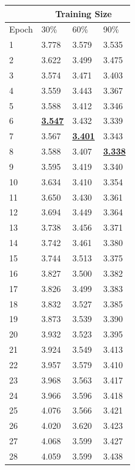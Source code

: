 \documentclass[12pt]{article}
\begin{document}
\begin{center}
          \tiny
          \begin{tabular}{|l || l| l| l|}
            \hline
            &\multicolumn{3}{|c|}{Training Size} \\
            \hline
            Epoch & 30\% & 60\% & 90\% \\
            \hline
            1 & 3.778 & 3.579 & 3.535 \\
            2 & 3.622 & 3.499 & 3.475 \\
            3 & 3.574 & 3.471 & 3.403 \\
            4 & 3.559 & 3.443 & 3.367 \\
            5 & 3.588 & 3.412 & 3.346 \\
            6 & \underline{\textbf{3.547}} & 3.432 & 3.339 \\
            7 & 3.567 & \underline{\textbf{3.401}} & 3.343 \\
            8 & 3.588 & 3.407 & \underline{\textbf{3.338}} \\
            9 & 3.595 & 3.419 & 3.340 \\
            10 & 3.634 & 3.410 & 3.354 \\
            11 & 3.650 & 3.430 & 3.361 \\
            12 & 3.694 & 3.449 & 3.364 \\
            13 & 3.738 & 3.456 & 3.371 \\
            14 & 3.742 & 3.461 & 3.380 \\
            15 & 3.744 & 3.513 & 3.375 \\
            16 & 3.827 & 3.500 & 3.382 \\
            17 & 3.826 & 3.499 & 3.383 \\
            18 & 3.832 & 3.527 & 3.385 \\
            19 & 3.873 & 3.539 & 3.390 \\
            20 & 3.932 & 3.523 & 3.395 \\
            21 & 3.924 & 3.549 & 3.413 \\
            22 & 3.957 & 3.579 & 3.410 \\
            23 & 3.968 & 3.563 & 3.417 \\
            24 & 3.966 & 3.596 & 3.418 \\
            25 & 4.076 & 3.566 & 3.421 \\
            26 & 4.020 & 3.620 & 3.423 \\
            27 & 4.068 & 3.599 & 3.427 \\
            28 & 4.059 & 3.599 & 3.438 \\

\end{tabular}
\end{center}
\end{document}
